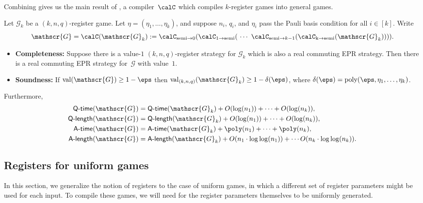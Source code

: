 \documentclass[11pt]{article}
\newcommand{\game}{\mathscr{G}}
\newcommand{\val}[1]{\mathrm{val}(#1)}
\newcommand{\valreg}[2]{\mathrm{val}_{#1}(#2)}
\newcommand{\qtime}[1]{\mathsf{Q}\textnormal{-}\mathsf{time}(#1)}
\newcommand{\atime}[1]{\mathsf{A}\textnormal{-}\mathsf{time}(#1)}
\newcommand{\qlength}[1]{\mathsf{Q}\textnormal{-}\mathsf{length}(#1)}
\newcommand{\alength}[1]{\mathsf{A}\textnormal{-}\mathsf{length}(#1)}
\begin{document}
Combining  gives us the main result of ,
a compiler~$\calC$ which compiles $k$-register games into general games.

\begin{theorem}\label{thm:registers}
Let $\game_k$ be a $(k, n, q)$-register game. 
Let $\eta = (\eta_1, \ldots, \eta_k)$, and suppose $n_i$, $q_i$, and $\eta_i$ pass the Pauli basis condition for all $i \in [k]$.
Write
\begin{equation*}
\game = \calC(\game_k) :=
\calC_{\mathrm{semi}\rightarrow 0}(\calC_{\mathrm{1} \rightarrow \mathrm{semi}}(~\cdots~
	\calC_{\mathrm{semi}\rightarrow k-1}(\calC_{\mathrm{k \rightarrow \mathrm{semi}}}(\game_k)))).
\end{equation*}
\begin{itemize}
\item[$\circ$] \textbf{Completeness:} Suppose there is a value-$1$ $(k,n,q)$-register strategy for $\game_{k}$ which is also a real commuting EPR strategy.
	Then there is a real commuting EPR strategy for~$\game$ with value~$1$.
\item[$\circ$] \textbf{Soundness:} If $\val{\game}\geq 1-\eps$ then $\valreg{(k,n,q)}{\game_{k}} \geq 1 -\delta(\eps)$, where $\delta(\eps) = \mathrm{poly}(\eps, \eta_1, \ldots, \eta_k)$.
\end{itemize}
Furthermore,
\begin{align*}
\qtime{\game} &= \qtime{\game_k} + O(\log(n_1))+ \cdots + O(\log(n_k)), \\
\qlength{\game} &= \qlength{\game_k} + O(\log(n_1)) + \cdots + O(\log(n_k)),  \\
\atime{\game} &= \atime{\game_k} + \poly(n_1) + \cdots + \poly(n_k),\\
\alength{\game} &= \alength{\game_k} + O(n_1 \cdot \log \log(n_1)) + \cdots O(n_k \cdot \log \log(n_k)).
\end{align*}
\end{theorem}

\subsection{Registers for uniform games}\label{sec:uniform-registers}

In this section, we generalize the notion of registers to the case of uniform games,
in which a different set of register parameters might be used for each input.
To compile these games, we will need for the register parameters themselves to be uniformly generated.
\end{document}
